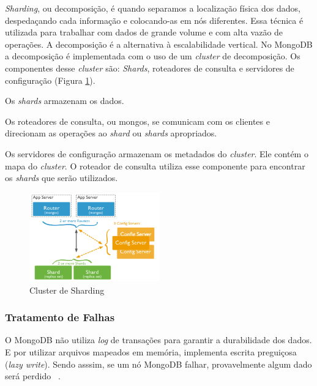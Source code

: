 \textit{Sharding}, ou decomposição, é quando separamos a localização física dos dados, despedaçando cada informação e colocando-as em nós diferentes. Essa técnica é utilizada para trabalhar com dados de grande volume e com alta vazão de operações. A decomposição é a alternativa à escalabilidade vertical. No MongoDB a decomposição é implementada com o uso de um \textit{cluster} de decomposição. Os componentes desse \textit{cluster} são: \textit{Shards}, roteadores de consulta e servidores de configuração (Figura \ref{fig:sharding}).

Os \textit{shards} armazenam os dados.

Os roteadores de consulta, ou mongos, se comunicam com os clientes e direcionam as operações ao \textit{shard} ou \textit{shards} apropriados.

Os servidores de configuração armazenam os metadados do \textit{cluster}. Ele contém o mapa do \textit{cluster}. O roteador de consulta utiliza esse componente para encontrar os \textit{shards} que serão utilizados.

	\begin{figure}[!htbp]
		\begin{center}
			\includegraphics[width=0.5\textwidth]{sharding}
		\end{center}
		\caption{Cluster de Sharding ~\cite{sitemongodb}}
		\label{fig:sharding}
	\end{figure}

\subsubsection{Tratamento de Falhas}

O MongoDB não utiliza \textit{log}  de transações para garantir a durabilidade dos dados. E por utilizar arquivos mapeados em memória, implementa escrita preguiçosa (\textit{lazy write}). Sendo asssim, se um nó MongoDB falhar, provavelmente algum dado será perdido ~\cite{Orendanalysisand}.